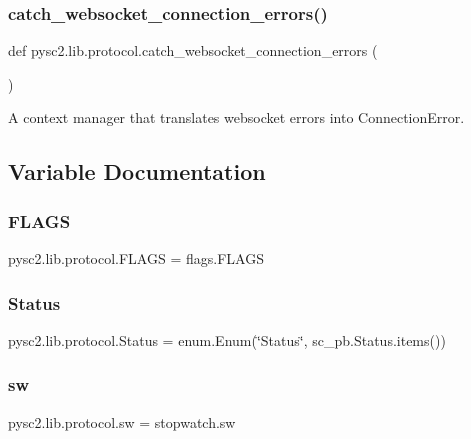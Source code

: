 \subsubsection{\texorpdfstring{catch\+\_\+websocket\+\_\+connection\+\_\+errors()}{catch\_websocket\_connection\_errors()}}
{\footnotesize\ttfamily def pysc2.\+lib.\+protocol.\+catch\+\_\+websocket\+\_\+connection\+\_\+errors (\begin{DoxyParamCaption}{ }\end{DoxyParamCaption})}

\begin{DoxyVerb}A context manager that translates websocket errors into ConnectionError.\end{DoxyVerb}
 

\subsection{Variable Documentation}
\mbox{\label{namespacepysc2_1_1lib_1_1protocol_a0f9d2fb7be1ab1b9bb882c2b68046203}} 
\subsubsection{\texorpdfstring{F\+L\+A\+GS}{FLAGS}}
{\footnotesize\ttfamily pysc2.\+lib.\+protocol.\+F\+L\+A\+GS = flags.\+F\+L\+A\+GS}

\mbox{\label{namespacepysc2_1_1lib_1_1protocol_adfe00ba6b54424ee04479b5340d49293}} 
\subsubsection{\texorpdfstring{Status}{Status}}
{\footnotesize\ttfamily pysc2.\+lib.\+protocol.\+Status = enum.\+Enum(\char`\"{}Status\char`\"{}, sc\+\_\+pb.\+Status.\+items())}

\mbox{\label{namespacepysc2_1_1lib_1_1protocol_a8612b29bdee56dc470fda95c8bbd8cb2}} 
\subsubsection{\texorpdfstring{sw}{sw}}
{\footnotesize\ttfamily pysc2.\+lib.\+protocol.\+sw = stopwatch.\+sw}


